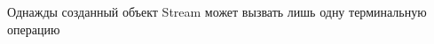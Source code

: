 \begin{frame}
\frametitle{\insertsection} 
\framesubtitle{\insertsubsection}
Однажды созданный объект Stream может вызвать лишь одну терминальную операцию
\inputminted{java}{code/OneTermination.java}
\end{frame}